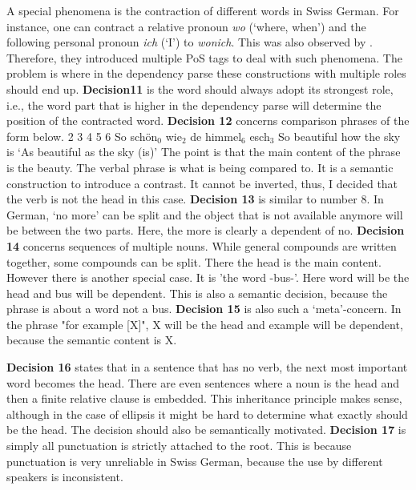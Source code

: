 \documentclass[11pt,letterpaper, covington]{article}
\begin{document}
A special phenomena is the contraction of different words in Swiss German. For instance, one can contract a relative pronoun \emph{wo} (`where, when') and the following personal pronoun \emph{ich} (`I') to \emph{wonich}. This  was also observed by \cite{AH12}. Therefore, they introduced multiple PoS tags to deal with such phenomena. The problem is where in the dependency parse these constructions with multiple roles should end up. \textbf{Decision11} is the word should always adopt its strongest role, i.e., the word part that is higher in the dependency parse will determine the position of the contracted word.
\textbf{Decision 12} concerns comparison phrases of the form below.
 2 3 4 5 6
So schön$_0$ wie$_2$ de himmel$_6$ esch$_3$
So beautiful how the sky is
\glt `As beautiful as the sky (is)'
\glend
The point is that the main content of the phrase is the beauty. The verbal phrase is what is being compared to. It is a semantic construction to introduce a contrast. It cannot be inverted, thus, I decided that the verb is not the head in this case.  
\textbf{Decision 13} is similar to number 8. In German, `no more' can be split and the object that is not available anymore will be between the two parts. Here, the more is clearly a dependent of no.
\textbf{Decision 14} concerns sequences of multiple nouns. While general compounds are written together, some compounds can be split. There the head is the main content. However there is another special case. It is 'the word -bus-'. Here word will be the head and bus will be dependent. This is also a semantic decision, because the phrase is about a word not a bus.
\textbf{Decision 15} is also such a `meta'-concern. In the phrase "for example [X]", X will be the head and example will be dependent, because the semantic content is X.  

\textbf{Decision 16} states that in a sentence that has no verb, the next most important word becomes the head. There are even sentences where a noun is the head and then a finite relative clause is embedded. This inheritance principle makes sense, although in the case of ellipsis it might be hard to determine what exactly should be the head. The decision should also be semantically motivated.
\textbf{Decision 17} is simply all punctuation is strictly attached to the root. This is because punctuation is very unreliable in Swiss German, because the use by different speakers is inconsistent.
\end{document}

